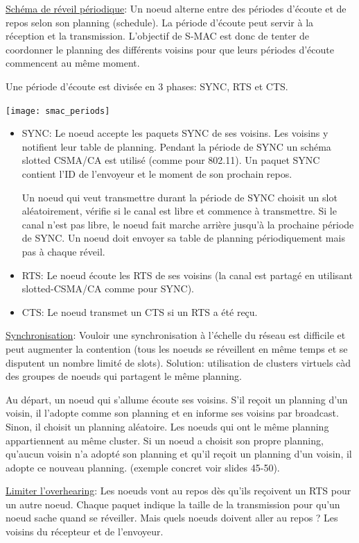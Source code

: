 \documentclass{article}
\begin{document}
\begin{sffamily}
\underline{Schéma de réveil périodique}:
Un noeud alterne entre des périodes d'écoute et de repos selon son
planning (schedule). La période d'écoute peut servir à la réception et
la transmission. L'objectif de S-MAC est donc de tenter de coordonner
le planning des différents voisins pour que leurs périodes d'écoute commencent
au même moment.

Une période d'écoute est divisée en 3 phases: SYNC, RTS et CTS.

\texttt{[image: smac\_periods]}

\begin{itemize}
\item SYNC:
Le noeud accepte les paquets SYNC de ses voisins. Les voisins y notifient
leur table de planning. Pendant la période de SYNC un schéma slotted CSMA/CA
est utilisé (comme pour 802.11).
Un paquet SYNC contient l'ID de l'envoyeur et le moment de son prochain repos.

Un noeud qui veut transmettre durant la période de SYNC choisit un slot
aléatoirement, vérifie si le canal est libre et commence à transmettre.
Si le canal n'est pas libre, le noeud fait marche arrière jusqu'à la prochaine
période de SYNC.
Un noeud doit envoyer sa table de planning périodiquement mais pas
à chaque réveil.
\item RTS:
Le noeud écoute les RTS de ses voisins (la canal est partagé en utilisant
slotted-CSMA/CA comme pour SYNC).
\item CTS:
Le noeud transmet un CTS si un RTS a été reçu.
\end{itemize}

\vspace{10px}
\underline{Synchronisation}:
Vouloir une synchronisation à l'échelle du réseau est difficile et peut
augmenter la contention (tous les noeuds se réveillent en même temps et
se disputent un nombre limité de slots).
Solution: utilisation de clusters virtuels càd des groupes de noeuds qui
partagent le même planning.

Au départ, un noeud qui s'allume écoute ses voisins. S'il reçoit un planning
d'un voisin, il l'adopte comme son planning et en informe ses voisins par
broadcast. Sinon, il choisit un planning aléatoire.
Les noeuds qui ont le même planning appartiennent au même cluster.
Si un noeud a choisit son propre planning, qu'aucun voisin n'a adopté son
planning et qu'il reçoit un planning d'un voisin, il adopte ce nouveau
planning.
(exemple concret voir slides 45-50).

\underline{Limiter l'overhearing}:
Les noeuds vont au repos dès qu'ils reçoivent un RTS pour un autre noeud.
Chaque paquet indique la taille de la transmission pour qu'un noeud sache
quand se réveiller. Mais quels noeuds doivent aller au repos ?
Les voisins du récepteur et de l'envoyeur.


\end{sffamily}
\end{document}
